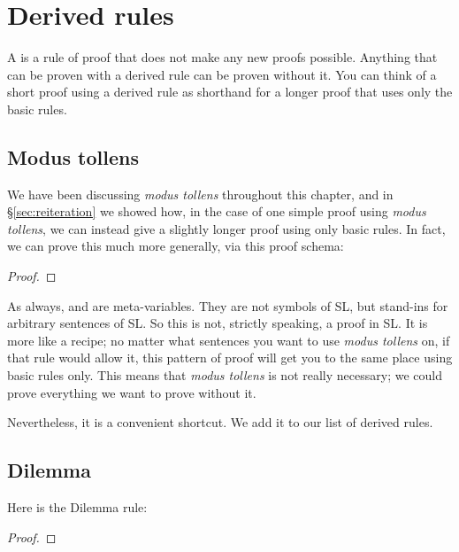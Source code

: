 \section{Derived rules}

A  is a rule of proof that does not make any new proofs possible. Anything that can be proven with a derived rule can be proven without it. You can think of a short proof using a derived rule as shorthand for a longer proof that uses only the basic rules. 

\subsection{Modus tollens}

We have been discussing \emph{modus tollens} throughout this chapter, and in \S\ref{sec:reiteration} we showed how, in the case of one simple proof using \emph{modus tollens}, we can instead give a slightly longer proof using only basic rules. In fact, we can prove this much more generally, via this proof schema:



\begin{proof}
	 \want{\enot \metaB{}}
	\open
		 
	\close
\end{proof}

As always,  \metaA{} and \metaB{} are meta-variables. They are not symbols of SL, but stand-ins for arbitrary sentences of SL. So this is not, strictly speaking, a proof in SL. It is more like a recipe; no matter what sentences you want to use \emph{modus tollens} on, if that rule would allow it, this pattern of proof will get you to the same place using basic rules only. This means that \emph{modus tollens} is not really necessary; we could prove everything we want to prove without it.

Nevertheless, it is a convenient shortcut. We add it to our list of derived rules.

\subsection{Dilemma}


Here is the Dilemma rule:

\begin{proof}
	 
\end{proof}

